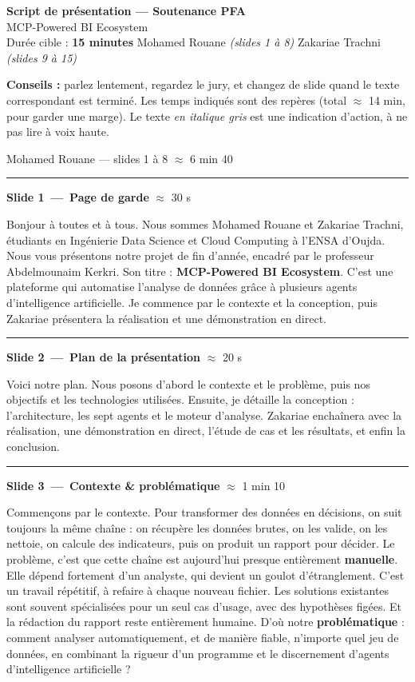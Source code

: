 \documentclass[11pt,a4paper]{article}
\newcommand{\presheader}[3]{%
  \bigskip\par\noindent
  \colorbox{accentdark}{%
    \parbox[c][0.98cm][c]{\dimexpr\linewidth-2\fboxsep\relax}{%
      \hspace{4pt}{\large\bfseries\color{white}#1}\quad
      {\color{accentsoft}\normalsize #2}\hfill
      {\color{accentsoft}\small #3}\hspace{4pt}}}%
  \par\medskip}
\newcommand{\slidecue}[3]{%
  \needspace{4\baselineskip}%
  \medskip\par\noindent
  {\color{accentdark}\rule[-3pt]{4pt}{17pt}}\hspace{8pt}%
  {\large\bfseries\color{ink}Slide #1\, — \,#2}%
  \hfill{\small\color{muted}#3}\par
  \nopagebreak\smallskip}
\newcommand{\cue}[1]{{\itshape\color{muted}#1}}
\begin{document}
\thispagestyle{fancy}

\begin{center}
  {\Large\bfseries\color{ink}Script de présentation — Soutenance PFA}\\[3pt]
  {\large\color{accentdark}MCP-Powered BI Ecosystem}\\[8pt]
  {\color{muted}Durée cible : \textbf{15 minutes} \;\textbullet\;
   Mohamed Rouane \emph{(slides 1 à 8)} \;\textbullet\;
   Zakariae Trachni \emph{(slides 9 à 15)}}
\end{center}
\vspace{2pt}
\noindent\colorbox{accentsoft}{%
  \parbox{\dimexpr\linewidth-2\fboxsep\relax}{\small\color{ink}\hspace{2pt}
  \textbf{Conseils :} parlez lentement, regardez le jury, et changez de slide
  quand le texte correspondant est terminé. Les temps indiqués sont des repères
  (total $\approx$ 14 min, pour garder une marge). Le texte \cue{en italique gris}
  est une indication d'action, à ne pas lire à voix haute.\hspace{2pt}}}

\presheader{Partie 1}{Mohamed Rouane — slides 1 à 8}{$\approx$ 6 min 40}

\slidecue{1}{Page de garde}{$\approx$ 30 s}
Bonjour à toutes et à tous. Nous sommes Mohamed Rouane et Zakariae Trachni,
étudiants en Ingénierie Data Science et Cloud Computing à l'ENSA d'Oujda. Nous
vous présentons notre projet de fin d'année, encadré par le professeur
Abdelmounaim Kerkri. Son titre : \textbf{MCP-Powered BI Ecosystem}. C'est une
plateforme qui automatise l'analyse de données grâce à plusieurs agents
d'intelligence artificielle. Je commence par le contexte et la conception, puis
Zakariae présentera la réalisation et une démonstration en direct.

\slidecue{2}{Plan de la présentation}{$\approx$ 20 s}
Voici notre plan. Nous posons d'abord le contexte et le problème, puis nos
objectifs et les technologies utilisées. Ensuite, je détaille la conception :
l'architecture, les sept agents et le moteur d'analyse. Zakariae enchaînera
avec la réalisation, une démonstration en direct, l'étude de cas et les
résultats, et enfin la conclusion.

\slidecue{3}{Contexte \& problématique}{$\approx$ 1 min 10}
Commençons par le contexte. Pour transformer des données en décisions, on suit
toujours la même chaîne : on récupère les données brutes, on les valide, on les
nettoie, on calcule des indicateurs, puis on produit un rapport pour décider.
Le problème, c'est que cette chaîne est aujourd'hui presque entièrement
\textbf{manuelle}. Elle dépend fortement d'un analyste, qui devient un goulot
d'étranglement. C'est un travail répétitif, à refaire à chaque nouveau fichier.
Les solutions existantes sont souvent spécialisées pour un seul cas d'usage,
avec des hypothèses figées. Et la rédaction du rapport reste entièrement
humaine. D'où notre \textbf{problématique} : comment analyser automatiquement,
et de manière fiable, n'importe quel jeu de données, en combinant la rigueur
d'un programme et le discernement d'agents d'intelligence artificielle ?
\end{document}
